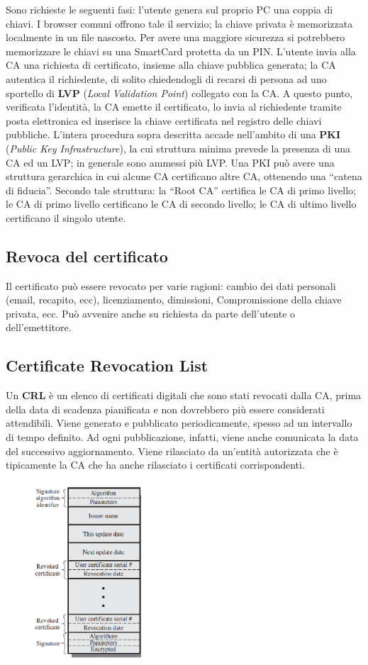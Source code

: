 Sono richieste le seguenti fasi: l'utente genera sul proprio PC una coppia
di chiavi. I browser
comuni offrono tale il servizio; la chiave privata è memorizzata localmente
in un file nascosto. Per
avere una maggiore sicurezza si potrebbero memorizzare le chiavi su una
SmartCard protetta da
un PIN. L'utente invia alla CA una richiesta di certificato, insieme alla
chiave pubblica generata; la
CA autentica il richiedente, di solito chiedendogli di recarsi di persona
ad uno sportello di \textbf{LVP}
(\textit{Local Validation Point}) collegato con la CA.
A questo punto, verificata l'identità, la CA emette il certificato,
lo invia al richiedente tramite posta
elettronica ed inserisce la chiave certificata nel registro delle chiavi
pubbliche.
L'intera procedura sopra descritta accade nell'ambito di una \textbf{PKI}
(\textit{Public Key Infrastructure}), la cui
struttura minima prevede la presenza di una CA ed un LVP; in generale
sono ammessi più LVP.
Una PKI può avere una struttura gerarchica in cui alcune CA certificano
altre CA, ottenendo una
“catena di fiducia”. Secondo tale struttura: la “Root CA” certifica le
CA di primo livello; le CA di
primo livello certificano le CA di secondo livello; le CA di ultimo
livello certificano il singolo utente.

\subsection{Revoca del certificato}

Il certificato può essere revocato per varie ragioni: cambio dei dati
personali (email, recapito, ecc),
licenziamento, dimissioni, Compromissione della chiave privata, ecc.
Può avvenire anche su richiesta da parte dell'utente o dell'emettitore.

\subsection{Certificate Revocation List}

Un \textbf{CRL} è un elenco di certificati digitali che sono stati revocati
dalla CA,
prima della data di scadenza pianificata e non dovrebbero più essere
considerati attendibili.
Viene generato e pubblicato periodicamente, spesso ad un intervallo di
tempo definito. Ad ogni
pubblicazione, infatti, viene anche comunicata la data del successivo
aggiornamento.
Viene rilasciato da un'entità autorizzata che è tipicamente la CA
che ha anche rilasciato i certificati
corrispondenti.

\begin{figure}[H]
    \centering
    \includegraphics[width=4cm, keepaspectratio]{capitoli/crittografia/imgs/CRL.png}
\end{figure}